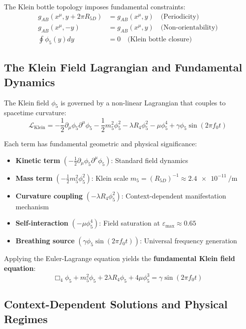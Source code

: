 \documentclass[12pt]{iopart}
\newcommand{\phifive}{\phi_5}
\newcommand{\epsmax}{\varepsilon_{\text{max}}}
\newcommand{\fzero}{f_0}
\newcommand{\Rfive}{R_{5D}}
\newcommand{\Rfour}{R_4}
\newcommand{\dalembertian}{\Box_4}
\begin{document}
The Klein bottle topology imposes fundamental constraints:
\begin{align}
g_{AB}(x^\mu, y + 2\pi\Rfive) &= g_{AB}(x^\mu, y) \quad \text{(Periodicity)} \\
g_{AB}(x^\mu, -y) &= g_{AB}(x^\mu, y) \quad \text{(Non-orientability)} \\
\oint \phifive(y) dy &= 0 \quad \text{(Klein bottle closure)}
\end{align}

\subsection{The Klein Field Lagrangian and Fundamental Dynamics}

The Klein field $\phifive$ is governed by a non-linear Lagrangian that couples to spacetime curvature:
\begin{equation}
\mathcal{L}_{\text{Klein}} = -\frac{1}{2} \partial_\mu\phifive \partial^\mu\phifive - \frac{1}{2}m_5^2\phifive^2 - \lambda\Rfour\phifive^2 - \mu\phifive^4 + \gamma\phifive \sin(2\pi\fzero t)
\label{eq:klein_lagrangian}
\end{equation}

Each term has fundamental geometric and physical significance:
\begin{itemize}
\item \textbf{Kinetic term} $(-\frac{1}{2} \partial_\mu\phifive \partial^\mu\phifive)$: Standard field dynamics
\item \textbf{Mass term} $(-\frac{1}{2}m_5^2\phifive^2)$: Klein scale $m_5 = (\Rfive)^{-1} \approx \SI{2.4e-11}{\per\meter}$
\item \textbf{Curvature coupling} $(-\lambda\Rfour\phifive^2)$: Context-dependent manifestation mechanism
\item \textbf{Self-interaction} $(-\mu\phifive^4)$: Field saturation at $\epsmax \approx 0.65$
\item \textbf{Breathing source} $(\gamma\phifive \sin(2\pi\fzero t))$: Universal frequency generation
\end{itemize}

Applying the Euler-Lagrange equation yields the \textbf{fundamental Klein field equation}:
\begin{equation}
\dalembertian\phifive + m_5^2\phifive + 2\lambda\Rfour\phifive + 4\mu\phifive^3 = \gamma \sin(2\pi\fzero t)
\label{eq:klein_field_equation}
\end{equation}

\subsection{Context-Dependent Solutions and Physical Regimes}
\end{document}
